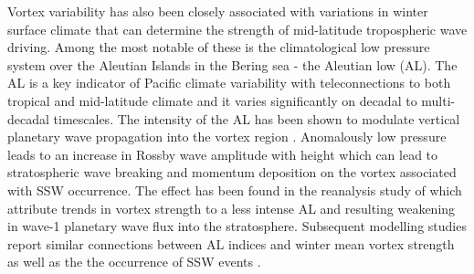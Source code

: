 Vortex variability has also been closely associated with variations in winter surface climate that can determine the strength of mid-latitude tropospheric wave driving. Among the most notable of these is the climatological low pressure system over the Aleutian Islands in the Bering sea - the Aleutian low (AL). The AL is a key indicator of Pacific climate variability with teleconnections to both tropical and mid-latitude climate \citep{Nitta1989, Trenberth1994, Zhang1997} and it varies significantly on decadal to multi-decadal timescales. The intensity of the AL has been shown to modulate vertical planetary wave propagation into the vortex region \citep{Woo2015, Garfinkel2010, manziniInfluence2006}. Anomalously low pressure leads to an increase in Rossby wave amplitude with height \citep{Plumb2003} which can lead to stratospheric wave breaking and momentum deposition on the vortex associated with SSW occurrence. The effect has been found in the reanalysis study of \cite{huDecadal2018} which attribute trends in vortex strength to a less intense AL and resulting weakening in wave-1 planetary wave flux into the stratosphere. Subsequent modelling studies report similar connections between AL indices and winter mean vortex strength as well as the the occurrence of SSW events \citep{krenWintertime2016}. 

